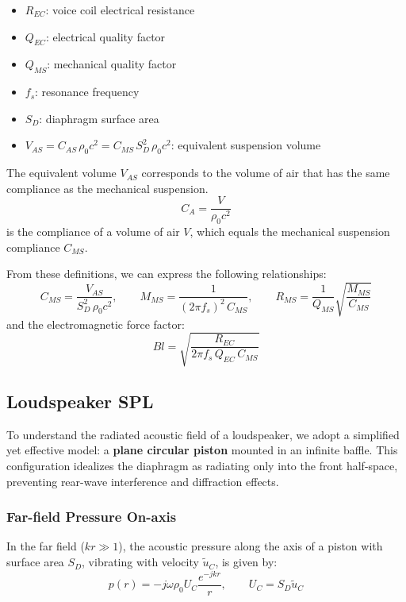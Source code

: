 \begin{itemize}
    \item \( R_{EC} \): voice coil electrical resistance
    \item \( Q_{EC} \): electrical quality factor
    \item \( Q_{MS} \): mechanical quality factor
    \item \( f_s \): resonance frequency
    \item \( S_D \): diaphragm surface area
    \item \( V_{AS} = C_{AS} \, \rho_0 c^2 = C_{MS} \, S_D^2 \, \rho_0 c^2 \): equivalent suspension volume
\end{itemize}

\noindent The equivalent volume \( V_{AS} \) corresponds to the volume of air that has the same compliance as the mechanical suspension.
\[
C_A = \frac{V}{\rho_0 c^2}
\]
is the compliance of a volume of air \( V \), which equals the mechanical suspension compliance \( C_{MS} \).

\bigskip
From these definitions, we can express the following relationships:
\[
C_{MS} = \frac{V_{AS}}{S_D^2 \, \rho_0 c^2}, \qquad
M_{MS} = \frac{1}{(2\pi f_s)^2 \, C_{MS}}, \qquad
R_{MS} = \frac{1}{Q_{MS}} \sqrt{\frac{M_{MS}}{C_{MS}}}
\]
and the electromagnetic force factor:
\[
B l = \sqrt{\frac{R_{EC}}{2\pi f_s \, Q_{EC} \, C_{MS}}}
\]

\subsection{Loudspeaker SPL}

To understand the radiated acoustic field of a loudspeaker, we adopt a simplified yet effective model: a \textbf{plane circular piston} mounted in an infinite baffle.  
This configuration idealizes the diaphragm as radiating only into the front half-space, preventing rear-wave interference and diffraction effects.

\subsubsection{Far-field Pressure On-axis}

In the far field (\( kr \gg 1 \)), the acoustic pressure along the axis of a piston with surface area \( S_D \), vibrating with velocity \( \tilde{u}_C \), is given by:
\[
p(r) = - j \omega \rho_0 U_C \frac{e^{-jkr}}{r}, \qquad U_C = S_D \tilde{u}_C
\]


